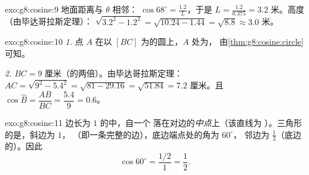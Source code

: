 \begin{solution}{exo:g8:cosine:9}
地面距离与 $\theta$ 相邻：
$\cos 68^\circ = \frac{1.2}{L}$，于是
$L = \frac{1.2}{0.375} = 3.2$ 米。高度（由毕达哥拉斯定理）：
$\sqrt{3.2^2 - 1.2^2} = \sqrt{10.24 - 1.44} = \sqrt{8.8} \approx 3.0$
米。
\end{solution}

\begin{solution}{exo:g8:cosine:10}
\emph{1.} 点 $A$ 在以 $[BC]$ 为的圆上，$A$ 处为，
由\cref{thm:g8:cosine:circle}可知。

\emph{2.} $BC = 9$ 厘米（的两倍）。由毕达哥拉斯定理：
$AC = \sqrt{9^2 - 5.4^2} = \sqrt{81 - 29.16} = \sqrt{51.84} = 7.2$
厘米。且 $\cos\widehat B = \dfrac{AB}{BC} = \dfrac{5.4}{9} = 0.6$。
\end{solution}

\begin{solution}{exo:g8:cosine:11}
边长为 $1$ 的中，自一个
落在对边的\emph{中点}上（该直线为
）。三角形的是，斜边为 $1$，
（即一条完整的边），底边端点处的角为 $60^\circ$，
邻边为 $\frac12$（底边的）。因此
\[
\cos 60^\circ = \frac{1/2}{1} = \frac12 .
\]
\end{solution}

